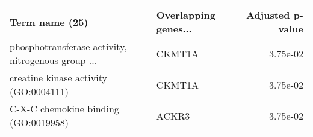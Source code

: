\begin{tabular}{llr}
\toprule
                                    Term name (25) & Overlapping genes... &  Adjusted p-value \\
\midrule
phosphotransferase activity, nitrogenous group ... &               CKMT1A &          3.75e-02 \\
             creatine kinase activity (GO:0004111) &               CKMT1A &          3.75e-02 \\
              C-X-C chemokine binding (GO:0019958) &                ACKR3 &          3.75e-02 \\
\bottomrule
\end{tabular}
